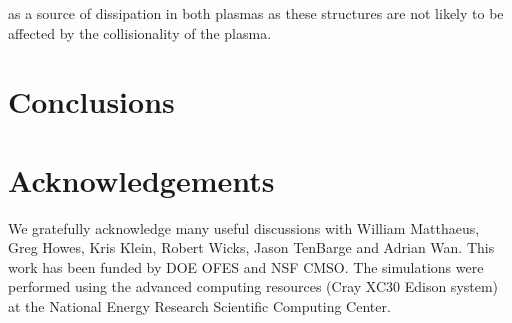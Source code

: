 \documentclass[aps,prl,amsmath,amssymb,reprint,superscriptaddress]{revtex4-1} %
\begin{document}
as a source of dissipation in both plasmas as these structures are not likely to be affected by the collisionality of the plasma.




\section{Conclusions}\label{sec:conclusions}

\section*{Acknowledgements}
  We gratefully acknowledge many useful discussions with William Matthaeus, Greg Howes, Kris Klein, Robert Wicks, Jason TenBarge and Adrian Wan. This work has been funded by DOE OFES and NSF CMSO.  The simulations were performed using the advanced computing resources (Cray XC30 Edison system) at the National Energy Research Scientific Computing Center.
\end{document}
